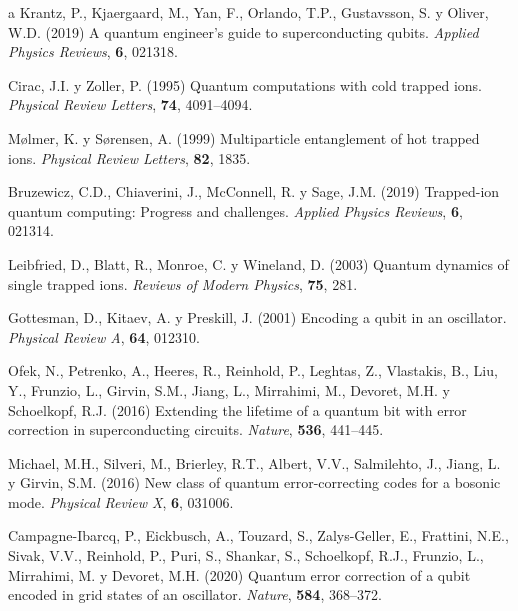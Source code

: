 \documentclass[11pt,a4paper,spanish]{book}
\begin{document}
\begin{thebibliography}{a}
		 Krantz, P., Kjaergaard, M., Yan, F., Orlando, T.P., Gustavsson, S. y Oliver, W.D. (2019) A quantum engineer's guide to superconducting qubits. \textit{Applied Physics Reviews}, \textbf{6}, 021318.
		
		
		 Cirac, J.I. y Zoller, P. (1995) Quantum computations with cold trapped ions. \textit{Physical Review Letters}, \textbf{74}, 4091--4094.
		
		 Mølmer, K. y Sørensen, A. (1999) Multiparticle entanglement of hot trapped ions. \textit{Physical Review Letters}, \textbf{82}, 1835.
		
		 Bruzewicz, C.D., Chiaverini, J., McConnell, R. y Sage, J.M. (2019) Trapped-ion quantum computing: Progress and challenges. \textit{Applied Physics Reviews}, \textbf{6}, 021314.
		
		 Leibfried, D., Blatt, R., Monroe, C. y Wineland, D. (2003) Quantum dynamics of single trapped ions. \textit{Reviews of Modern Physics}, \textbf{75}, 281.
		
		
		 Gottesman, D., Kitaev, A. y Preskill, J. (2001) Encoding a qubit in an oscillator. \textit{Physical Review A}, \textbf{64}, 012310.
		
		 Ofek, N., Petrenko, A., Heeres, R., Reinhold, P., Leghtas, Z., Vlastakis, B., Liu, Y., Frunzio, L., Girvin, S.M., Jiang, L., Mirrahimi, M., Devoret, M.H. y Schoelkopf, R.J. (2016) Extending the lifetime of a quantum bit with error correction in superconducting circuits. \textit{Nature}, \textbf{536}, 441--445.
		
		 Michael, M.H., Silveri, M., Brierley, R.T., Albert, V.V., Salmilehto, J., Jiang, L. y Girvin, S.M. (2016) New class of quantum error-correcting codes for a bosonic mode. \textit{Physical Review X}, \textbf{6}, 031006.
		
		 Campagne-Ibarcq, P., Eickbusch, A., Touzard, S., Zalys-Geller, E., Frattini, N.E., Sivak, V.V., Reinhold, P., Puri, S., Shankar, S., Schoelkopf, R.J., Frunzio, L., Mirrahimi, M. y Devoret, M.H. (2020) Quantum error correction of a qubit encoded in grid states of an oscillator. \textit{Nature}, \textbf{584}, 368--372.
		

\end{thebibliography}
\end{document}
